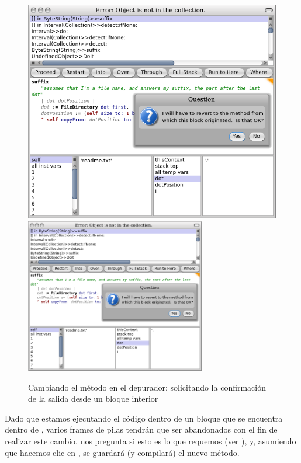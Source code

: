 \documentclass[spanish,a4paper,10pt,twoside]{book}
\begin{document}
\begin{figure}[btp]
	\begin{center}
	\ifluluelse
		{\includegraphics[width=\textwidth]{revertDialog}}
		{\includegraphics[width=0.7\textwidth]{revertDialog}}
	\end{center}
	\caption{Cambiando el m\'etodo   en el depurador: solicitando la confirmaci\'on de la salida desde un bloque interior}
\end{figure}


Dado que estamos ejecutando el c\'odigo dentro de un bloque que se encuentra dentro de  , varios frames de pilas tendr\'an que ser abandonados con el fin de realizar este cambio.  \pharo nos pregunta si esto es lo que requemos (ver ), y, asumiendo que hacemos clic en , se guardar\'a (y compilar\'a) el nuevo m\'etodo.
\end{document}
